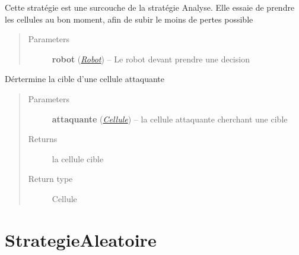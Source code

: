 \documentclass[letterpaper,10pt,english]{sphinxmanual}
\begin{document}
\begin{fulllineitems}
\label{index:StrategiePrevision.StrategiePrevision}
Cette stratégie est une surcouche de la stratégie Analyse.
Elle essaie de prendre les cellules au bon moment, afin de subir le moins de pertes possible
\begin{quote}\begin{description}
\item[{Parameters}] \leavevmode
\textbf{robot} ({\hyperref[index:module-Robot]{\emph{Robot}}}) -- Le robot devant prendre une decision

\end{description}\end{quote}

\begin{fulllineitems}
\label{index:StrategiePrevision.StrategiePrevision.determinerCible}
Dértermine la cible d'une cellule attaquante
\begin{quote}\begin{description}
\item[{Parameters}] \leavevmode
\textbf{attaquante} ({\hyperref[index:module-Cellule]{\emph{Cellule}}}) -- la cellule attaquante cherchant une cible

\item[{Returns}] \leavevmode
la cellule cible

\item[{Return type}] \leavevmode
Cellule

\end{description}\end{quote}

\end{fulllineitems}


\end{fulllineitems}



\chapter{StrategieAleatoire}
\label{index:module-StrategieAleatoire}\label{index:strategiealeatoire}
\end{document}
